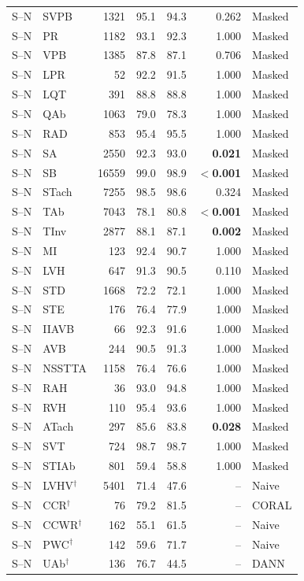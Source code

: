 \begin{longtable}{@{}llrrrrl@{}}
S--N & SVPB & 1321 & 95.1 & 94.3 & 0.262 & Masked \\
S--N & PR & 1182 & 93.1 & 92.3 & 1.000 & Masked \\
S--N & VPB & 1385 & 87.8 & 87.1 & 0.706 & Masked \\
S--N & LPR & 52 & 92.2 & 91.5 & 1.000 & Masked \\
S--N & LQT & 391 & 88.8 & 88.8 & 1.000 & Masked \\
S--N & QAb & 1063 & 79.0 & 78.3 & 1.000 & Masked \\
S--N & RAD & 853 & 95.4 & 95.5 & 1.000 & Masked \\
S--N & SA & 2550 & 92.3 & 93.0 & \textbf{0.021} & Masked \\
S--N & SB & 16559 & 99.0 & 98.9 & \textbf{$<$0.001} & Masked \\
S--N & STach & 7255 & 98.5 & 98.6 & 0.324 & Masked \\
S--N & TAb & 7043 & 78.1 & 80.8 & \textbf{$<$0.001} & Masked \\
S--N & TInv & 2877 & 88.1 & 87.1 & \textbf{0.002} & Masked \\
S--N & MI & 123 & 92.4 & 90.7 & 1.000 & Masked \\
S--N & LVH & 647 & 91.3 & 90.5 & 0.110 & Masked \\
S--N & STD & 1668 & 72.2 & 72.1 & 1.000 & Masked \\
S--N & STE & 176 & 76.4 & 77.9 & 1.000 & Masked \\
S--N & IIAVB & 66 & 92.3 & 91.6 & 1.000 & Masked \\
S--N & AVB & 244 & 90.5 & 91.3 & 1.000 & Masked \\
S--N & NSSTTA & 1158 & 76.4 & 76.6 & 1.000 & Masked \\
S--N & RAH & 36 & 93.0 & 94.8 & 1.000 & Masked \\
S--N & RVH & 110 & 95.4 & 93.6 & 1.000 & Masked \\
S--N & ATach & 297 & 85.6 & 83.8 & \textbf{0.028} & Masked \\
S--N & SVT & 724 & 98.7 & 98.7 & 1.000 & Masked \\
S--N & STIAb & 801 & 59.4 & 58.8 & 1.000 & Masked \\
S--N & LVHV$^\dagger$ & 5401 & 71.4 & 47.6 & -- & Naive \\
S--N & CCR$^\dagger$ & 76 & 79.2 & 81.5 & -- & CORAL \\
S--N & CCWR$^\dagger$ & 162 & 55.1 & 61.5 & -- & Naive \\
S--N & PWC$^\dagger$ & 142 & 59.6 & 71.7 & -- & Naive \\
S--N & UAb$^\dagger$ & 136 & 76.7 & 44.5 & -- & DANN \\

\end{longtable}
